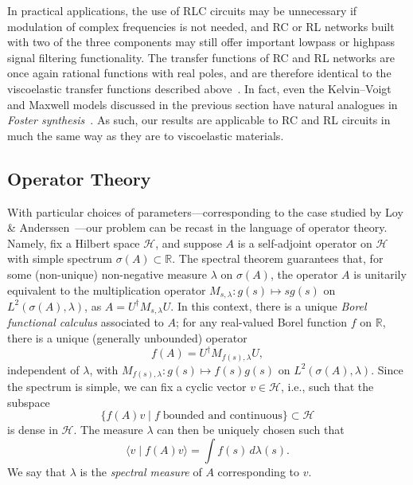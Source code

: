 \documentclass{cams-l} %
\newcommand{\dave}[1]{#1}\newcommand{\davebegin}{}\newcommand{\daveend}{}\newcommand{\george}[1]{#1}
\newcommand{\RR}{\mathbb R}
\newcommand{\cH}{\mathcal H}
\theoremstyle{definition}
\theoremstyle{remark}
\numberwithin{equation}{section}
\begin{document}
In practical applications, the use of RLC circuits may be unnecessary if modulation of complex frequencies is not needed, and RC or RL networks built with two of the three components may still offer important lowpass or highpass signal filtering functionality. The transfer functions of RC and RL networks are once again rational functions with real poles, and are therefore identical to the viscoelastic transfer functions described \dave{above}~\cite[Ch.~4]{morelli2019passive}. In fact, even the Kelvin--Voigt and Maxwell models discussed in the previous section have natural analogues in \emph{Foster synthesis}~\cite{bakshi2020electrical}. As such, \dave{our results} are applicable to RC and RL circuits in much the same way as they are to viscoelastic materials.

\subsection{Operator Theory}\label{sec:operatortheory}
With particular choices of parameters---corresponding to the case studied by Loy \& Anderssen~\cite{loy_anderssen}---our problem can be recast in the language of operator theory. Namely, fix a Hilbert space $\cH$, and suppose $A$ is a self-adjoint operator on $\cH$ with simple spectrum $\sigma(A)\subset\RR$. \dave{The spectral theorem guarantees that, for some (non-unique) non-negative measure $\lambda$ on $\sigma(A)$, the operator $A$ is unitarily equivalent to the multiplication operator $M_{s,\lambda}:g(s)\mapsto sg(s)$ on $L^2(\sigma(A),\lambda)$, as $A = U^\dagger M_{s,\lambda} U$. In this context, there is a unique \emph{Borel functional calculus} associated to $A$; for any real-valued Borel function $f$ on $\RR$, there is a unique (generally unbounded) operator 
\[f(A)= U^\dagger M_{f(s),\lambda}U,\]
independent of $\lambda$, with $M_{f(s),\lambda}:g(s)\mapsto f(s)g(s)$ on $L^2(\sigma(A),\lambda)$.
Since the spectrum is simple, we can fix a cyclic vector $v\in\cH$, i.e., such that the subspace
\[\{f(A)v\;|\;f\;\text{bounded and continuous}\}\subset\cH
\]
is dense in $\cH$. The measure $\lambda$ can then be uniquely chosen such that
\[\langle v\;|\;f(A)v\rangle = \int f(s)\,d\lambda(s).\]
We say that $\lambda$ is the \emph{spectral measure} of $A$ corresponding to $v$. }
\end{document}
